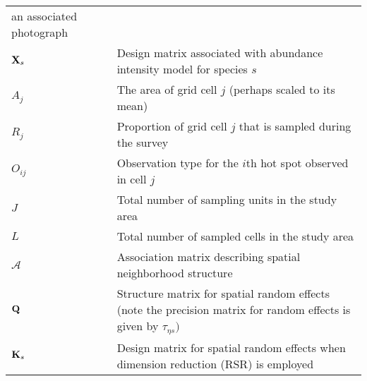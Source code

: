 \documentclass[12pt,fleqn]{article}
\begin{document}
\begin{flushleft}
\begin{longtable}{p{1.5cm}l p{14cm}}
              an associated photograph \\
${\bf X}_s$   & & Design matrix associated with abundance intensity model for species $s$\\
$A_j$   & & The area of grid cell $j$ (perhaps scaled to its mean)\\
$R_j$  & & Proportion of grid cell $j$ that is sampled during the survey \\
$O_{ij}$ & & Observation type for the $i$th hot spot observed in cell $j$ \\
$J$  & & Total number of sampling units in the study area \\
$L$  & & Total number of sampled cells in the study area \\
$\mathcal{A}$ & & Association matrix describing spatial neighborhood structure \\
${\bf Q} $  & & Structure matrix for spatial random effects (note the precision matrix for
  random effects is given by $\tau_{\eta s})$\\
${\bf K}_s $  & & Design matrix for spatial random effects when dimension reduction (RSR) is employed\\

\hline
\end{longtable}

\pagebreak


\end{flushleft}
\end{document}
